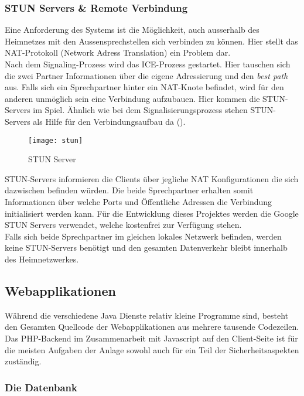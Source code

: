 \subsubsection{STUN Servers \& Remote Verbindung}
\label{test}
Eine Anforderung des Systems ist die Möglichkeit, auch ausserhalb des Heimnetzes mit den Aussensprechstellen sich verbinden zu können. Hier stellt das NAT-Protokoll (Network Adress Translation) ein Problem dar.
\\
Nach dem Signaling-Prozess wird das ICE-Prozess gestartet. Hier tauschen sich die zwei Partner Informationen über die eigene Adressierung und den \textit{best path} aus. Falls sich ein Sprechpartner hinter ein NAT-Knote befindet, wird für den anderen unmöglich sein eine Verbindung aufzubauen. Hier kommen die STUN-Servers im Spiel. Ähnlich wie bei dem Signalisierungsprozess stehen STUN-Servers als Hilfe für den Verbindungsaufbau da ().
\begin{figure}[htb!]
	\begin{center}
		\texttt{[image: stun]}
		\caption[STUN Server]{STUN Server}
		\label{fig:stun}
	\end{center}
\end{figure}
STUN-Servers informieren die Clients über jegliche NAT Konfigurationen die sich dazwischen befinden würden. Die beide Sprechpartner erhalten somit Informationen über welche Ports und Öffentliche Adressen die Verbindung initialisiert werden kann. Für die Entwicklung dieses Projektes werden die Google STUN Servers verwendet, welche kostenfrei zur Verfügung stehen.
\\
Falls sich beide Sprechpartner im gleichen lokales Netzwerk befinden, werden keine STUN-Servers benötigt und den gesamten Datenverkehr bleibt innerhalb des Heimnetzwerkes.

\subsection{Webapplikationen}
\label{kap:webapp}
Während die verschiedene Java Dienste relativ kleine Programme sind, besteht den Gesamten Quellcode der Webapplikationen aus mehrere tausende Codezeilen.
\\
Das PHP-Backend im Zusammenarbeit mit Javascript auf den Client-Seite ist für die meisten Aufgaben der Anlage sowohl auch für ein Teil der Sicherheitsaspekten zuständig.

\subsubsection{Die Datenbank}

